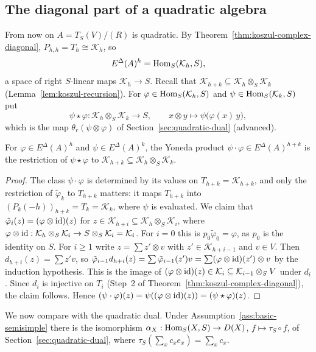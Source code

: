\subsection{The diagonal part of a quadratic algebra}

From now on $A=T_S(V)/(R)$ is quadratic.
By Theorem~\ref{thm:koszul-complex-diagonal}, $P_{h,h}=T_h\cong\mathcal K_h$, so
\[
E^\Delta(A)^h=\operatorname{Hom}\nolimits_S(\mathcal K_h,S),
\]
a space of right $S$-linear maps $\mathcal K_h\to S$.
Recall that $\mathcal K_{h+k}\subseteq\mathcal K_h\otimes_S\mathcal K_k$ (Lemma~\ref{lem:koszul-recursion}).
For $\varphi\in\operatorname{Hom}\nolimits_S(\mathcal K_h,S)$ and $\psi\in\operatorname{Hom}\nolimits_S(\mathcal K_k,S)$ put
\[
\psi\star\varphi:\mathcal K_h\otimes_S\mathcal K_k\to S,\qquad x\otimes y\longmapsto\psi\bigl(\varphi(x)\,y\bigr),
\]
which is the map $\theta_r(\psi\otimes\varphi)$ of Section~\ref{sec:quadratic-dual} (advanced).

\begin{proposition}\label{prop:diagonal-product}
For $\varphi\in E^\Delta(A)^h$ and $\psi\in E^\Delta(A)^k$, the Yoneda product $\psi\cdot\varphi\in E^\Delta(A)^{h+k}$ is the restriction of $\psi\star\varphi$ to $\mathcal K_{h+k}\subseteq\mathcal K_h\otimes_S\mathcal K_k$.
\end{proposition}

\begin{proof}
The class $\psi\cdot\varphi$ is determined by its values on $T_{h+k}=\mathcal K_{h+k}$, and only the restriction of $\tilde\varphi_k$ to $T_{h+k}$ matters: it maps $T_{h+k}$ into $(P_k(-h))_{h+k}=T_k=\mathcal K_k$, where $\psi$ is evaluated.
We claim that $\tilde\varphi_i(z)=(\varphi\otimes\operatorname{id})(z)$ for $z\in\mathcal K_{h+i}\subseteq\mathcal K_h\otimes_S\mathcal K_i$, where $\varphi\otimes\operatorname{id}:\mathcal K_h\otimes_S\mathcal K_i\to S\otimes_S\mathcal K_i=\mathcal K_i$.
For $i=0$ this is $p_0\tilde\varphi_0=\varphi$, as $p_0$ is the identity on $S$.
For $i\geq1$ write $z=\sum z'\otimes v$ with $z'\in\mathcal K_{h+i-1}$ and $v\in V$.
Then $d_{h+i}(z)=\sum z'v$, so $\tilde\varphi_{i-1}d_{h+i}(z)=\sum\tilde\varphi_{i-1}(z')v=\sum(\varphi\otimes\operatorname{id})(z')\otimes v$ by the induction hypothesis.
This is the image of $(\varphi\otimes\operatorname{id})(z)\in\mathcal K_i\subseteq\mathcal K_{i-1}\otimes_SV$ under $d_i$.
Since $d_i$ is injective on $T_i$ (Step~2 of Theorem~\ref{thm:koszul-complex-diagonal}), the claim follows.
Hence $(\psi\cdot\varphi)(z)=\psi((\varphi\otimes\operatorname{id})(z))=(\psi\star\varphi)(z)$.
\end{proof}

We now compare with the quadratic dual.
Under Assumption~\ref{ass:basic-semisimple} there is the isomorphism $\alpha_X:\operatorname{Hom}\nolimits_S(X,S)\to D(X)$, $f\mapsto\tau_S\circ f$, of Section~\ref{sec:quadratic-dual}, where $\tau_S(\sum_xc_xe_x)=\sum_xc_x$.


